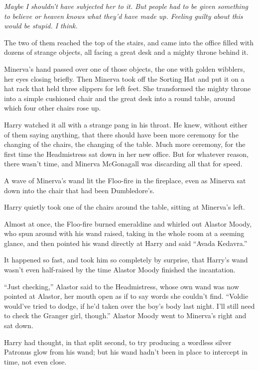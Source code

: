 \emph{Maybe I shouldn’t have subjected her to it. But people had to be given \emph{something} to believe or heaven knows what they’d have made up. Feeling guilty about this would be stupid. I think.}

The two of them reached the top of the stairs, and came into the office filled with dozens of strange objects, all facing a great desk and a mighty throne behind it.

Minerva’s hand passed over one of those objects, the one with golden wibblers, her eyes closing briefly. Then Minerva took off the Sorting Hat and put it on a hat rack that held three slippers for left feet. She transformed the mighty throne into a simple cushioned chair and the great desk into a round table, around which four other chairs rose up.

Harry watched it all with a strange pang in his throat. He knew, without either of them saying anything, that there should have been more ceremony for the changing of the chairs, the changing of the table. Much more ceremony, for the first time the Headmistress sat down in her new office. But for whatever reason, there wasn’t time, and Minerva McGonagall was discarding all that for speed.

A wave of Minerva’s wand lit the Floo-fire in the fireplace, even as Minerva sat down into the chair that had been Dumbledore’s.

Harry quietly took one of the chairs around the table, sitting at Minerva’s left.

Almost at once, the Floo-fire burned emeraldine and whirled out Alastor Moody, who spun around with his wand raised, taking in the whole room at a seeming glance, and then pointed his wand directly at Harry and said “Avada Kedavra.”

It happened so fast, and took him so completely by surprise, that Harry’s wand wasn’t even half-raised by the time Alastor Moody finished the incantation.

“Just checking,” Alastor said to the Headmistress, whose own wand was now pointed at Alastor, her mouth open as if to say words she couldn’t find. “Voldie would’ve tried to dodge, if he’d taken over the boy’s body last night. I’ll still need to check the Granger girl, though.” Alastor Moody went to Minerva’s right and sat down.

Harry had thought, in that split second, to try producing a wordless silver Patronus glow from his wand; but his wand hadn’t been in place to intercept in time, not even close.

